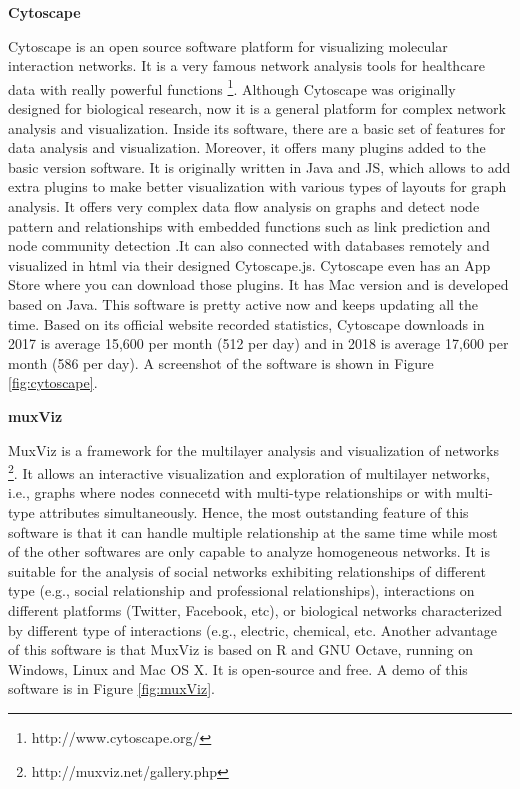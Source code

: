\textbf{Cytoscape}

Cytoscape \cite{smoot2010cytoscape} is an open source software platform for visualizing molecular interaction networks. It is a very famous network analysis tools for healthcare data with really powerful functions \footnote{http://www.cytoscape.org/}.  Although Cytoscape was originally designed for biological research, now it is a general platform for complex network analysis and visualization. Inside its software, there are a basic set of features for data analysis and visualization. Moreover, it offers many plugins added to the basic version software.  It is originally written in Java and JS, which allows to add extra plugins to make better visualization with various types of layouts for graph analysis. It offers very complex data flow analysis on graphs and detect node pattern and relationships with embedded functions such as link prediction and node community detection .It can also connected with databases remotely and visualized in html via their designed Cytoscape.js. Cytoscape even has an App Store where you can download those plugins. It has Mac version and is developed based on Java. This software is pretty active now and keeps updating all the time. Based on its official website recorded statistics, Cytoscape downloads in 2017 is average 15,600 per month (512 per day) and in 2018 is average 17,600 per month (586 per day). A screenshot of the software is shown in Figure \ref{fig:cytoscape}. 

\textbf{muxViz}

MuxViz \cite{de2015muxviz}  is a framework for the multilayer analysis and visualization of networks \footnote{http://muxviz.net/gallery.php}. It allows an interactive visualization and exploration of multilayer networks, i.e., graphs where nodes connecetd with multi-type relationships or with multi-type attributes simultaneously. Hence, the most outstanding feature of this software is that it can handle multiple relationship at the same time while most of the other softwares are only capable to analyze homogeneous networks. It is suitable for the analysis of social networks exhibiting relationships of different type (e.g., social relationship and professional relationships), interactions on different platforms (Twitter, Facebook, etc), or biological networks characterized by different type of interactions (e.g., electric, chemical, etc.  Another advantage of this software is that MuxViz is based on R and GNU Octave, running on Windows, Linux and Mac OS X. It is open-source and free. A demo of this software is in Figure \ref{fig:muxViz}.


